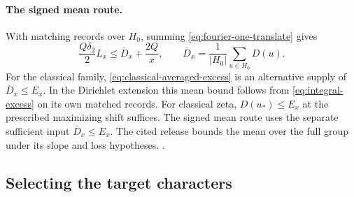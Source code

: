 \paragraph{The signed mean route.}
With matching records over \(H_0\), summing
\eqref{eq:fourier-one-translate} gives
\begin{equation}
\label{eq:fourier-translate-mean}
 \frac{Q\delta_2}{2}L_x\le \overline D_x+\frac{2Q}{x},\qquad
 \overline D_x=\frac1{|H_0|}\sum_{u\in H_0}D(u).
\end{equation}
For the classical family, \eqref{eq:classical-averaged-excess} is an
alternative supply of \(\overline D_x\le E_x\). In the Dirichlet
extension this mean bound follows from \eqref{eq:integral-excess} on
its own matched records.
{For classical zeta, \(D(u_*)\le E_x\) at the prescribed maximizing
shift suffices. The signed mean route uses the separate sufficient
input \(\overline D_x\le E_x\).}
The cited release bounds the mean over the full group under its
slope and loss hypotheses.
.

\subsection{Selecting the target characters}

